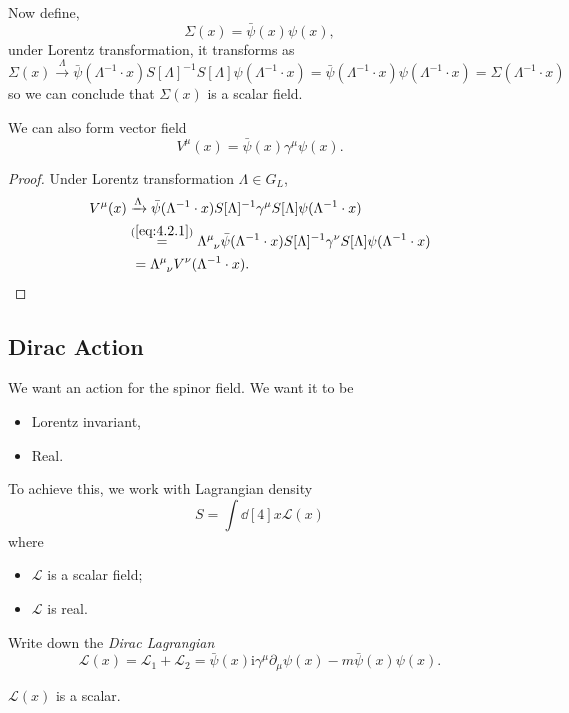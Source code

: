 \documentclass[a4paper,11pt]{article}
\begin{document}
	Now define, 
	\[
		\Sigma(x) = \bar \psi(x) \psi(x),
	\]
	under Lorentz transformation, it transforms as 
	\[
		\Sigma(x) \xrightarrow{\Lambda} \bar \psi(\Lambda^{-1} \cdot x) S[\Lambda]^{-1} S[\Lambda] \psi(\Lambda^{-1} \cdot x) = \bar \psi(\Lambda^{-1}\cdot x) \psi(\Lambda^{-1} \cdot x) = \Sigma(\Lambda^{-1} \cdot x)
	\]
	so we can conclude that $\Sigma(x)$ is a scalar field.

	\begin{clm}
		We can also form vector field
		\[
			V^\mu(x) = \bar \psi(x) \gamma^\mu \psi(x).
		\]
	\end{clm}
	\begin{proof}
		Under Lorentz transformation $\Lambda \in G_L$,
		\begin{align*}
			V^\mu(x) & \xrightarrow{\Lambda} \bar \psi(\Lambda^{-1} \cdot x) S[\Lambda]^{-1} \gamma^\mu S[\Lambda] \psi(\Lambda^{-1} \cdot x)\\
			& \overset{(\ref{eq:4.2.1})}{=} \LT{\mu}{\nu} \bar \psi(\Lambda^{-1} \cdot x) S[\Lambda]^{-1} \gamma^\nu S[\Lambda] \psi(\Lambda^{-1} \cdot x)\\
			&\ = \LT{\mu}{\nu} V^\nu (\Lambda^{-1} \cdot x).
		\end{align*}
	\end{proof}

	\subsection{Dirac Action}

	We want an action for the spinor field. We want it to be 
	\begin{itemize}
		\item Lorentz invariant,
		\item Real.
	\end{itemize}
	To achieve this, we work with Lagrangian density 
	\[
		S = \int \dd[4]{x} \mathcal{L}(x)
	\]
	where 
	\begin{itemize}
		\item $\mathcal{L}$ is a scalar field;
		\item $\mathcal{L}$ is real.	
	\end{itemize}
	
	Write down the \emph{Dirac Lagrangian}
	\[
		\mathcal{L}(x) = \mathcal{L}_1 + \mathcal{L}_2 = \bar \psi(x) \mathrm{i} \gamma^\mu \partial_\mu \psi(x) - m \bar \psi(x) \psi(x).
	\]
	
	\begin{clm}
		$\mathcal{L}(x)$ is a scalar.
	\end{clm}
\end{document}
